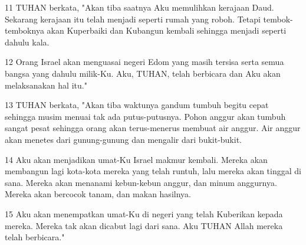 \par 11 TUHAN berkata, "Akan tiba saatnya Aku memulihkan kerajaan Daud. Sekarang kerajaan itu telah menjadi seperti rumah yang roboh. Tetapi tembok-temboknya akan Kuperbaiki dan Kubangun kembali sehingga menjadi seperti dahulu kala.
\par 12 Orang Israel akan menguasai negeri Edom yang masih tersisa serta semua bangsa yang dahulu milik-Ku. Aku, TUHAN, telah berbicara dan Aku akan melaksanakan hal itu."
\par 13 TUHAN berkata, "Akan tiba waktunya gandum tumbuh begitu cepat sehingga musim menuai tak ada putus-putusnya. Pohon anggur akan tumbuh sangat pesat sehingga orang akan terus-menerus membuat air anggur. Air anggur akan menetes dari gunung-gunung dan mengalir dari bukit-bukit.
\par 14 Aku akan menjadikan umat-Ku Israel makmur kembali. Mereka akan membangun lagi kota-kota mereka yang telah runtuh, lalu mereka akan tinggal di sana. Mereka akan menanami kebun-kebun anggur, dan minum anggurnya. Mereka akan bercocok tanam, dan makan hasilnya.
\par 15 Aku akan menempatkan umat-Ku di negeri yang telah Kuberikan kepada mereka. Mereka tak akan dicabut lagi dari sana. Aku TUHAN Allah mereka telah berbicara."


